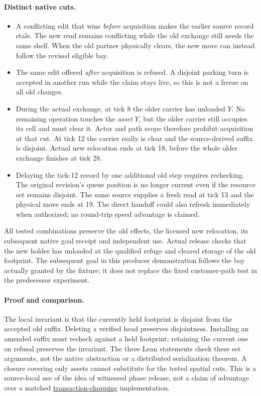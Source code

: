 \documentclass[11pt]{article}
\begin{document}
\paragraph{Distinct native cuts.}
\begin{itemize}
\item A conflicting edit that wins \emph{before} acquisition makes
the earlier source record stale. The new read remains conflicting
while the old exchange still needs the same shelf. When the old
partner physically clears, the new move can instead follow the
revised eligible bay.
\item The same edit offered \emph{after} acquisition is refused.
A disjoint parking turn is accepted in another run while the
claim stays live, so this is not a freeze on all old changes.
\item During the actual exchange, at tick 8 the older carrier
has unloaded $Y$. No remaining operation touches the \emph{asset}
$Y$, but the older carrier still occupies its cell and must clear
it. Actor and path scope therefore prohibit acquisition at that
cut. At tick 12 the carrier really is clear and the source-derived
suffix is disjoint. Actual new relocation ends at tick 18, before
the whole older exchange finishes at tick 28.
\item Delaying the tick-12 record by one additional old step
requires rechecking. The original revision's queue position is
no longer current even if the resource set remains disjoint.
The same source supplies a fresh read at tick 13 and the
physical move ends at 19. The direct handoff could also refresh
immediately when authorized; no round-trip speed advantage is claimed.
\end{itemize}

All tested combinations preserve the old effects, the licensed
new relocation, its subsequent native goal receipt and independent
use. Actual release checks that the new holder has unloaded at the
qualified refuge and cleared storage of the old footprint. The
subsequent goal in this producer demonstration follows the bay
actually granted by the fixture; it does not replace the fixed
customer-path test in the predecessor experiment.

\paragraph{Proof and comparison.}
The local invariant is that the currently held footprint is disjoint
from the accepted old suffix. Deleting a verified head preserves
disjointness. Installing an amended suffix must recheck against a
held footprint; retaining the current one on refusal preserves
the invariant. The three Lean statements check these set arguments,
not the native abstraction or a distributed serialization theorem.
A closure covering only assets cannot substitute for the tested
spatial cuts. This is a source-local use of the idea of witnessed
phase release, not a claim of advantage over a matched
\href{https://cs.nyu.edu/~shasha/papers/chopping.pdf}
{transaction-chopping} implementation.
\end{document}
